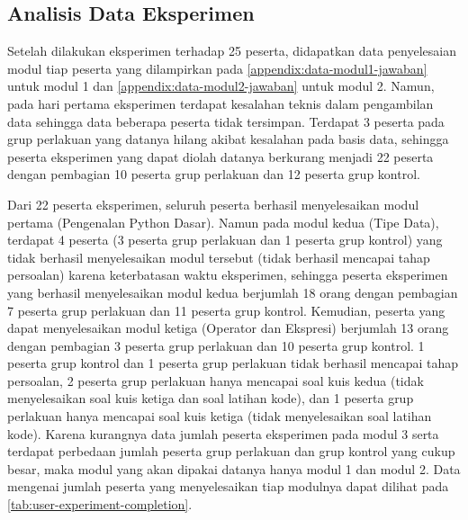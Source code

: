 \subsection{Analisis Data Eksperimen}
Setelah dilakukan eksperimen terhadap 25 peserta, didapatkan data penyelesaian modul tiap peserta yang dilampirkan pada \autoref{appendix:data-modul1-jawaban} untuk modul 1 dan \autoref{appendix:data-modul2-jawaban} untuk modul 2. Namun, pada hari pertama eksperimen terdapat kesalahan teknis dalam pengambilan data sehingga data beberapa peserta tidak tersimpan. Terdapat 3 peserta pada grup perlakuan yang datanya hilang akibat kesalahan pada basis data, sehingga peserta eksperimen yang dapat diolah datanya berkurang menjadi 22 peserta dengan pembagian 10 peserta grup perlakuan dan 12 peserta grup kontrol.

Dari 22 peserta eksperimen, seluruh peserta berhasil menyelesaikan modul pertama (Pengenalan Python Dasar). Namun pada modul kedua (Tipe Data), terdapat 4 peserta (3 peserta grup perlakuan dan 1 peserta grup kontrol) yang tidak berhasil menyelesaikan modul tersebut (tidak berhasil mencapai tahap persoalan) karena keterbatasan waktu eksperimen, sehingga peserta eksperimen yang berhasil menyelesaikan modul kedua berjumlah 18 orang dengan pembagian 7 peserta grup perlakuan dan 11 peserta grup kontrol. Kemudian, peserta yang dapat menyelesaikan modul ketiga (Operator dan Ekspresi) berjumlah 13 orang dengan pembagian 3 peserta grup perlakuan dan 10 peserta grup kontrol. 1 peserta grup kontrol dan 1 peserta grup perlakuan tidak berhasil mencapai tahap persoalan, 2 peserta grup perlakuan hanya mencapai soal kuis kedua (tidak menyelesaikan soal kuis ketiga dan soal latihan kode), dan 1 peserta grup perlakuan hanya mencapai soal kuis ketiga (tidak menyelesaikan soal latihan kode). Karena kurangnya data jumlah peserta eksperimen pada modul 3 serta terdapat perbedaan jumlah peserta grup perlakuan dan grup kontrol yang cukup besar, maka modul yang akan dipakai datanya hanya modul 1 dan modul 2. Data mengenai jumlah peserta yang menyelesaikan tiap modulnya dapat dilihat pada \autoref{tab:user-experiment-completion}.

